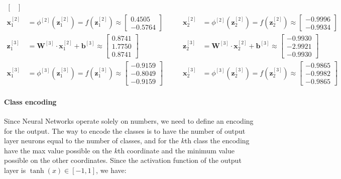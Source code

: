 \documentclass[12pt]{article}
\begin{document}
\begin{enumerate}[leftmargin=\labelsep]
\begin{equation}
\begin{aligned}
\begin{bmatrix}
        \end{bmatrix} \\
        \mathbf{x}_1^{[2]} &= \phi^{[2]}(\mathbf{z}_1^{[2]}) = f(\mathbf{z}_1^{[2]}) \approx \begin{bmatrix}
            0.4505 \\ -0.5764
        \end{bmatrix}&\qquad \mathbf{x}_2^{[2]} &= \phi^{[2]}(\mathbf{z}_2^{[2]}) = f(\mathbf{z}_2^{[2]}) \approx \begin{bmatrix}
            -0.9996 \\ -0.9934
        \end{bmatrix} \\
        \mathbf{z}_1^{[3]} &= \mathbf{W}^{[3]} \cdot \mathbf{x}_1^{[2]} + \mathbf{b}^{[3]} \approx \begin{bmatrix}
            0.8741 \\ 1.7750 \\ 0.8741
        \end{bmatrix} &\qquad \mathbf{z}_2^{[3]} &= \mathbf{W}^{[3]} \cdot \mathbf{x}_2^{[2]} + \mathbf{b}^{[3]} \approx \begin{bmatrix}
            -0.9930 \\ -2.9921 \\ -0.9930
        \end{bmatrix} \\
        \mathbf{x}_1^{[3]} &= \phi^{[3]}(\mathbf{z}_1^{[3]}) = f(\mathbf{z}_1^{[3]}) \approx \begin{bmatrix}
            -0.9159 \\ -0.8049 \\ -0.9159
        \end{bmatrix} &\qquad \mathbf{x}_2^{[3]} &= \phi^{[3]}(\mathbf{z}_2^{[3]}) = f(\mathbf{z}_2^{[3]}) \approx \begin{bmatrix}
            -0.9865 \\ -0.9982 \\ -0.9865
        \end{bmatrix}
    \end{aligned}
    \end{equation}

    \paragraph{Class encoding} Since Neural Networks operate solely on numbers, we need to define an encoding for the output. The way to encode the classes is to have the number of output layer neurons equal to the number of classes, and for the $k$th class the encoding have the max value possible on the $k$th coordinate and the minimum value possible on the other coordinates. Since the activation function of the output layer is $\tanh(x) \in [-1, 1]$, we have:


\end{enumerate}
\end{document}
